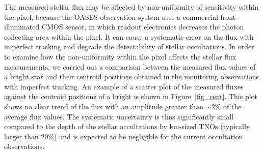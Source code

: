 \documentclass{pasj01}
\newcommand{\void}[1]{}
\renewcommand{\textcolor}{\void}
\begin{document}
\textcolor{red}{
The measured stellar flux may be affected by non-uniformity of sensitivity within the pixel,
because the OASES observation system uses a commercial front-illuminated CMOS sensor,
in which readout electronics decreases the photon collecting area within the pixel. 
It can cause a systematic error on the flux with imperfect tracking and degrade the detectability 
of stellar occultations. 
In order to examine how the non-uniformity within the pixel affects the stellar flux measurements, 
we carried out a comparison between the measured flux values of a bright star 
and their centroid positions obtained in the monitoring observations with imperfect tracking. 
An example of a scatter plot of the measured fluxes against the centroid positions of a bright 
is shown in Figure~\ref{fig_cent}. 
This plot shows no clear trend of the flux with an amplitude greater than $\sim 2\%$ of the average flux values. 
The systematic uncertainty is thus  significantly small compared to the depth of the stellar occultations by km-sized 
TNOs (typically larger than  $20\%$) and is expected to be negligible for the current occultation observations.
}

\end{document}
